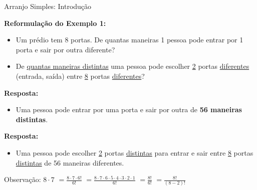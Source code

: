 \documentclass[aspectratio=169]{beamer}
\begin{document}
\begin{frame}{Arranjo Simples: Introdução}

    \textbf{Reformulação do Exemplo 1:}
    
        \vspace{4mm}
        \begin{itemize}
            \item Um prédio tem 8 portas. De quantas maneiras 1 pessoa pode entrar por 1 porta e sair por outra diferente?
            \item De \underline{quantas maneiras distintas} uma pessoa pode escolher \underline{2} portas \underline{diferentes} (entrada, saída) entre \underline{8} portas \underline{diferentes}?
        \end{itemize}
    
        \vspace{2mm}
    
       \textbf{ Resposta:}
    
        \begin{itemize}
            \item[] Uma pessoa pode entrar por uma porta e sair por outra de \textbf{56 maneiras distintas}.
        \end{itemize}

        \vspace{2mm}
        \textbf{ Resposta:}

        \begin{itemize}
            \item[] Uma pessoa pode escolher \underline{2} portas \underline{distintas} para entrar e sair entre \underline{8} portas \underline{distintas} de 56 maneiras diferentes.
        \end{itemize}

        \vspace{2mm}

        Observação: $8 \cdot 7$ \pause $ = \frac{8 \cdot 7 \cdot 6!}{6!}$ \pause $= \frac{8 \cdot 7 \cdot 6 \cdot 5 \cdot 4 \cdot 3 \cdot 2 \cdot 1}{6!}$ \pause $ = \frac{8!}{6!}$ \pause $ = \frac{8!}{(8 - 2)!}$
    

    \end{frame}
\end{document}
